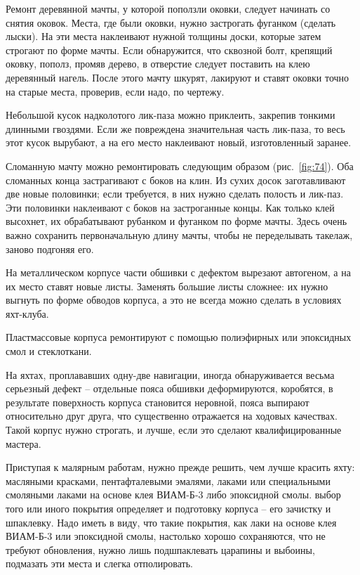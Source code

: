 \documentclass[a4paper, 12pt, twoside, final]{scrbook}
\begin{document}
Ремонт деревянной мачты, у которой поползли оковки, следует начинать со снятия оковок. Места, где были оковки, нужно застрогать фуганком (сделать лыски). На эти места наклеивают нужной толщины доски, которые затем строгают по форме мачты. Если обнаружится, что сквозной болт, крепящий оковку, пополз, промяв дерево, в отверстие следует поставить на клею деревянный нагель. После этого мачту шкурят, лакируют и ставят оковки точно на старые места, проверив, если надо, по чертежу.

Небольшой кусок надколотого лик-паза можно приклеить, закрепив тонкими длинными гвоздями. Если же повреждена значительная часть лик-паза, то весь этот кусок вырубают, а на его место наклеивают новый, изготовленный заранее.

Сломанную мачту можно ремонтировать следующим образом (рис.~\ref{fig:74}). Оба сломанных конца застрагивают с боков на клин. Из сухих досок заготавливают две новые половинки; если требуется, в них нужно сделать полость и лик-паз. Эти половинки наклеивают с боков на застроганные концы. Как только клей высохнет, их обрабатывают рубанком и фуганком по форме мачты. Здесь очень важно сохранить первоначальную длину мачты, чтобы не переделывать такелаж, заново подгоняя его.

На металлическом корпусе части обшивки с дефектом вырезают автогеном, а на их место ставят новые листы. Заменять большие листы сложнее: их нужно выгнуть по форме обводов корпуса, а это не всегда можно сделать в условиях яхт-клуба.

Пластмассовые корпуса ремонтируют с помощью полиэфирных или эпоксидных смол и стеклоткани.

На яхтах, проплававших одну-две навигации, иногда обнаруживается весьма серьезный дефект \--- отдельные пояса обшивки деформируются, коробятся, в результате поверхность корпуса становится неровной, пояса выпирают относительно друг друга, что существенно отражается на ходовых качествах. Такой корпус нужно строгать, и лучше, если это сделают квалифицированные мастера.

Приступая к малярным работам, нужно прежде решить, чем лучше красить яхту: масляными красками, пентафталевыми эмалями, лаками или специальными смоляными лаками на основе клея ВИАМ-Б-3 либо эпоксидной смолы. выбор того или иного покрытия определяет и подготовку корпуса \--- его зачистку и шпаклевку. Надо иметь в виду, что такие покрытия, как лаки на основе клея ВИАМ-Б-3 или эпоксидной смолы, настолько хорошо сохраняются, что не требуют обновления, нужно лишь подшпаклевать царапины и выбоины, подмазать эти места и слегка отполировать.
\end{document}
